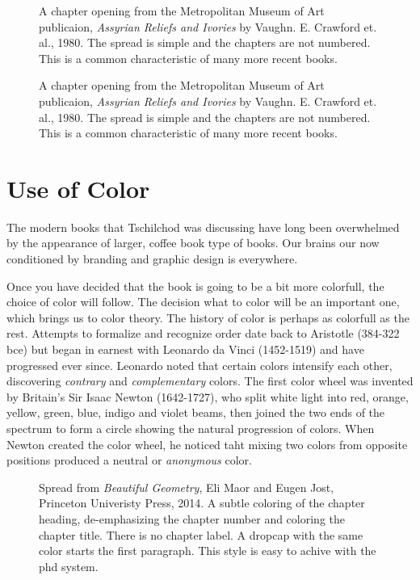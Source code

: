 \begin{figure}[tbp]
\centering
\parindent=0pt
\par
\caption{A chapter opening from the Metropolitan Museum of Art publicaion, \textit{Assyrian Reliefs and Ivories} by Vaughn. E. Crawford et. al., 1980. The spread is simple and the chapters are not numbered. This is a common characteristic of many more recent books.}
\end{figure}


\begin{figure}[tbp]
\centering
\parindent=0pt
\par
\caption{A chapter opening from the Metropolitan Museum of Art publicaion, \textit{Assyrian Reliefs and Ivories} by Vaughn. E. Crawford et. al., 1980. The spread is simple and the chapters are not numbered. This is a common characteristic of many more recent books.}
\end{figure}


\section*{Use of Color}

The modern books that Tschilchod was discussing have long been overwhelmed by the appearance of larger, coffee book type of books. Our brains our now conditioned by branding and graphic design is everywhere. 

Once you have decided that the book is going to be a bit more colorfull, the choice of color will follow. The decision what to color will be an important one, which brings us to color theory. The history of color is perhaps as colorfull as the rest. Attempts to formalize and recognize order date back to Aristotle (384-322 bce) but began in earnest with Leonardo da Vinci (1452-1519) and have progressed ever since. Leonardo noted that certain colors intensify each other, discovering \textit{contrary} and \textit{complementary} colors. The first color wheel was invented by Britain's Sir Isaac Newton (1642-1727), who split white light into red, orange, yellow, green, blue, indigo and violet beams, then joined the two ends of the spectrum to form a circle showing the natural progression of colors. When Newton created the color wheel, he noticed taht mixing two colors from opposite positions produced a neutral or \textit{anonymous} color.


\begin{figure}[htbp]
\parindent=0pt
\centering
{}
\caption{Spread from \textit{Beautiful Geometry}, Eli Maor and Eugen Jost, Princeton Univeristy Press, 2014. A subtle coloring of the chapter heading, de-emphasizing the chapter number and coloring the chapter title. There is no chapter label. A dropcap with the same color starts the first paragraph. This style is easy to achive with the phd system.}
\end{figure}


